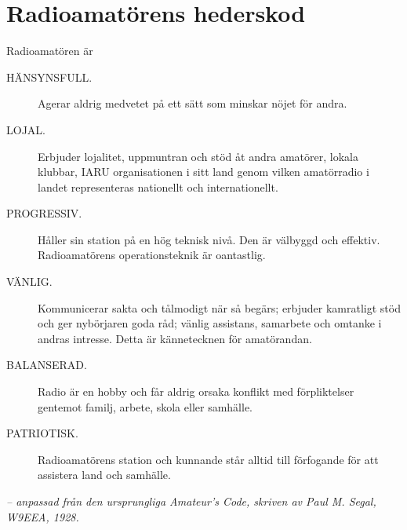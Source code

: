 \newpage %
\section[Hederskod]{Radioamatörens hederskod}

Radioamatören är

\begin{description}
  \item[HÄNSYNSFULL.] Agerar aldrig medvetet på ett sätt som minskar nöjet för
    andra.

  \item[LOJAL.] Erbjuder lojalitet, uppmuntran och stöd åt andra amatörer,
    lokala klubbar, IARU organisationen i sitt land genom vilken amatörradio i
	landet representeras nationellt och internationellt.

  \item[PROGRESSIV.] Håller sin station på en hög teknisk nivå. Den är välbyggd
    och effektiv. Radioamatörens operationsteknik är oantastlig.

  \item[VÄNLIG.] Kommunicerar sakta och tålmodigt när så begärs; erbjuder
    kamratligt stöd och ger nybörjaren goda råd; vänlig assistans, samarbete och
    omtanke i andras intresse. Detta är kännetecknen för amatörandan.

  \item[BALANSERAD.] Radio är en hobby och får aldrig orsaka konflikt med
    förpliktelser gentemot familj, arbete, skola eller samhälle.

  \item[PATRIOTISK.] Radioamatörens station och kunnande står alltid till
    förfogande för att assistera land och samhälle.
\end{description}

\emph{-- anpassad från den ursprungliga Amateur's Code, skriven av Paul M. Segal, W9EEA, 1928.}
